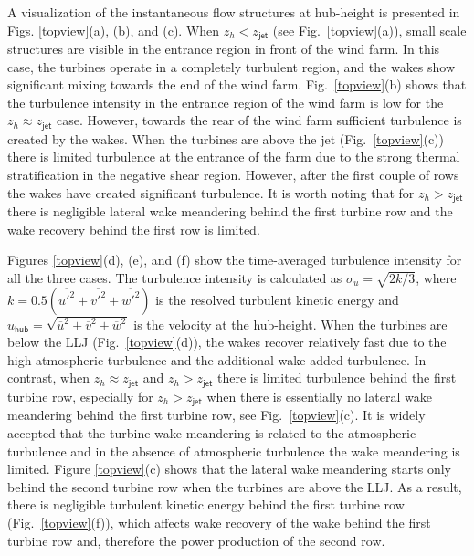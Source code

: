 \documentclass[%
 aip,
 amsmath,amssymb,
preprint,%
author-numerical,%
]{revtex4-1}
\begin{document}
A visualization of the instantaneous flow structures at hub-height is presented in Figs. \ref{topview}(a), (b), and (c). When $z_h<z_\mathsf{jet}$ (see Fig.\ \ref{topview}(a)), small scale structures are visible in the entrance region in front of the wind farm. In this case, the turbines operate in a completely turbulent region, and the wakes show significant mixing towards the end of the wind farm. Fig.\ \ref{topview}(b) shows that the turbulence intensity in the entrance region of the wind farm is low for the $z_h \approx z_\mathsf{jet}$ case. However, towards the rear of the wind farm sufficient turbulence is created by the wakes. When the turbines are above the jet (Fig.\ \ref{topview}(c)) there is limited turbulence at the entrance of the farm due to the strong thermal stratification in the negative shear region. However, after the first couple of rows the wakes have created significant turbulence. It is worth noting that for $z_h > z_\mathsf{jet}$ there is negligible lateral wake meandering behind the first turbine row and the wake recovery behind the first row is limited.

Figures \ref{topview}(d), (e), and (f) show the time-averaged turbulence intensity for all the three cases. The turbulence intensity is calculated as $\sigma_u=\sqrt{2k/3}$, where $k=0.5 (\overline{u'^2} +\overline{v'^2} + \overline{w'^2})$ is the resolved turbulent kinetic energy and $u_\mathsf{hub} = \sqrt{\overline{{u}}^2 + \overline{{v}}^2 + \overline{{w}}^2}$ is the velocity at the hub-height. When the turbines are below the LLJ (Fig.\ \ref{topview}(d)), the wakes recover relatively fast due to the high atmospheric turbulence and the additional wake added turbulence. In contrast, when $z_h \approx z_\mathsf{jet}$ and $z_h > z_\mathsf{jet}$ there is limited turbulence behind the first turbine row, especially for  $z_h > z_\mathsf{jet}$ when there is essentially no lateral wake meandering behind the first turbine row, see Fig.\ \ref{topview}(c). It is widely accepted that the turbine wake meandering is related to the atmospheric turbulence \cite{mao18, lar08} and in the absence of atmospheric turbulence the wake meandering is limited. Figure \ref{topview}(c) shows that the lateral wake meandering starts only behind the second turbine row when the turbines are above the LLJ. As a result, there is negligible turbulent kinetic energy behind the first turbine row (Fig.\ \ref{topview}(f)), which affects wake recovery of the wake behind the first turbine row and, therefore the power production of the second row.
\end{document}
